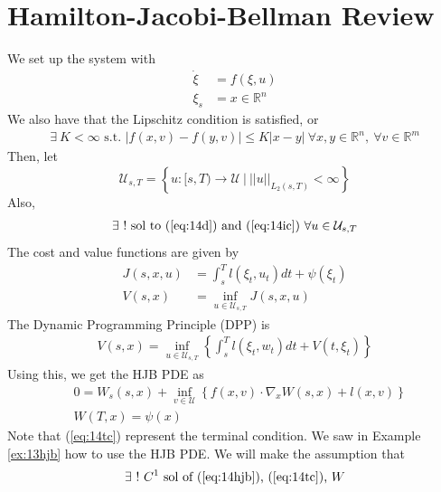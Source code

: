 
\mainmatter
\setcounter{page}{1}

\lectureseries[\course]{\course}

\date{November 17, 2009}

\setaddress

\setcounter{lecture}{13}
\setcounter{chapter}{13}


\section{Hamilton-Jacobi-Bellman Review}

We set up the system with
\begin{align}
\label{eq:14d}
\dot{\xi} &= f(\xi,u) \\
\label{eq:14ic}
\xi_s &= x\in\mathbb{R}^n
\end{align}
We also have that the Lipschitz condition is satisfied, or
\begin{align}
\label{eq:14l}
\exists ~ K<\infty \text{ s.t. } |f(x,v)-f(y,v)| \leq K|x-y| ~\forall x,y\in\mathbb{R}^n, ~\forall v\in\mathbb{R}^m
\end{align}
Then, let
$$\mathcal{U}_{s,T} = \left\lbrace u:[s,T)\to\mathcal{U} ~|~ ||u||_{L_2(s,T)}<\infty \right\rbrace$$
Also,
\begin{align}
\label{eq:14cset}
\exists ~! \text{ sol to (\ref{eq:14d}) and (\ref{eq:14ic}) } \forall u\in\mathcal{U}_{s,T}
\end{align}
The cost and value functions are given by
\begin{align*}
J(s,x,u) &= \int_s^T l(\xi_t,u_t)dt + \psi(\xi_t) \\
V(s,x) &= \inf_{u\in\mathcal{U}_{s,T}} J(s,x,u)
\end{align*}
The Dynamic Programming Principle (DPP) is
\begin{align}
\label{eq:14dpp}
V(s,x) = \inf_{u\in\mathcal{U}_{s,T}} \left\lbrace \int_s^T l(\xi_t,w_t)dt + V(t,\xi_t) \right\rbrace
\end{align}
Using this, we get the HJB PDE as
\begin{align}
\label{eq:14hjb}
&0 = W_s(s,x) + \inf_{v\in\mathcal{U}} \left\lbrace f(x,v)\cdot\nabla_xW(s,x)+l(x,v) \right\rbrace \\
\label{eq:14tc}
&W(T,x) = \psi(x)
\end{align}
Note that (\ref{eq:14tc}) represent the terminal condition. We saw in Example \ref{ex:13hjb} how to use the HJB PDE. We will make the assumption that
\begin{align}
\label{eq:14ae}
\exists~ !~ C^1 \text{ sol of (\ref{eq:14hjb}), (\ref{eq:14tc}), } W
\end{align}

